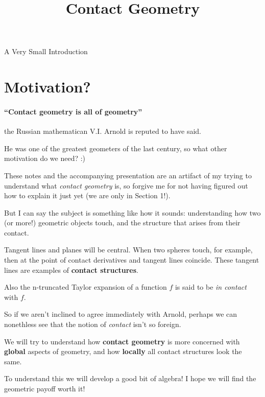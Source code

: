 \documentclass{article}
\begin{document}
\title {Contact Geometry}
\maketitle

\centerline{\sc \large A Very Small Introduction }
\onehalfspace

\tableofcontents

\section { Motivation?}

\paragraph{``Contact geometry is all of geometry''} the Russian mathematican
V.I. Arnold is reputed to have said.

He was one of the greatest geometers of the last century, so what other
motivation do we need? :)

These notes and the accompanying presentation are an artifact of my trying to
understand what \textsl{contact geometry} is, so forgive me for not having
figured out how to explain it just yet (we are only in Section 1!).

But I can say the subject is something like how it sounds: understanding how two
(or more!) geometric objects touch, and the structure that arises from their contact.

Tangent lines and planes will be central. When two spheres touch, for example,
then at the point of contact derivatives and tangent lines coincide. These tangent
lines are examples of \textbf{contact structures}.

Also the n-truncated Taylor expansion of a function $f$ is said to be \textsl{in
  contact} with $f$.

So if we aren't inclined to agree immediately with Arnold, perhaps we can nonethless see
that the notion of \textsl{contact} isn't so foreign.

We will try to understand how \textbf{contact geometry} is more concerned with
\textbf{global} aspects of geometry, and how \textbf{locally} all contact
structures look the same.

To understand this we will develop a good bit of algebra! I hope we will find
the geometric payoff worth it!
\end{document}
